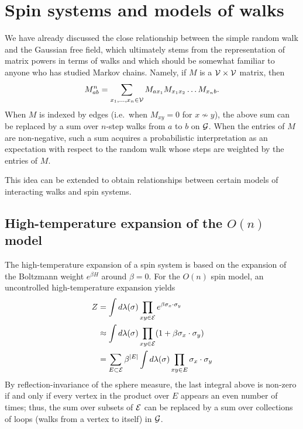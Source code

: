 \section{Spin systems and models of walks}

We have already discussed the close relationship between the simple random walk
and the Gaussian free field, which ultimately stems from the representation of
matrix powers in terms of walks and which should be somewhat familiar to anyone
who has studied Markov chains. Namely, if $M$ is a $\mathcal{V}\times\mathcal{V}$
matrix, then
\begin{equation}
M^n_{ab} = \sum_{x_1,\ldots,x_n\in\mathcal{V}} M_{ax_1} M_{x_1x_2} \ldots M_{x_nb}.
\end{equation}
When $M$ is indexed by edges (i.e.\ when $M_{xy} = 0$ for $x \not\sim y$), the
above sum can be replaced by a sum over $n$-step walks from $a$ to $b$ on $\mathcal{G}$.
When the entries of $M$ are non-negative, such a sum acquires a probabilistic
interpretation as an expectation with respect to the random walk whose steps
are weighted by the entries of $M$.

This idea can be extended to obtain relationships between certain models of
interacting walks and spin systems.


\subsection{High-temperature expansion of the \texorpdfstring{$O(n)$}{O(n)} model}

The high-temperature expansion of a spin system is based on the expansion of the
Boltzmann weight $e^{\beta H}$ around $\beta = 0$.
For the $O(n)$ spin model, an uncontrolled high-temperature expansion yields
\begin{align}
Z 	&= \int d\lambda(\sigma) \prod_{xy\in\mathcal{E}} e^{\beta \sigma_x \cdot \sigma_y} \\
	&\approx \int d\lambda(\sigma) \prod_{xy\in\mathcal{E}} (1 + \beta \sigma_x \cdot \sigma_y) \\
	&= \sum_{E \subset \mathcal{E}} \beta^{|E|} \int d\lambda(\sigma) \prod_{xy \in E} \sigma_x \cdot \sigma_y
\end{align}
By reflection-invariance of the sphere measure, the last integral above is non-zero
if and only if every vertex in the product over $E$ appears an even number of times;
thus, the sum over subsets of $\mathcal{E}$ can be replaced by a sum over collections of
loops (walks from a vertex to itself) in $\mathcal{G}$.

